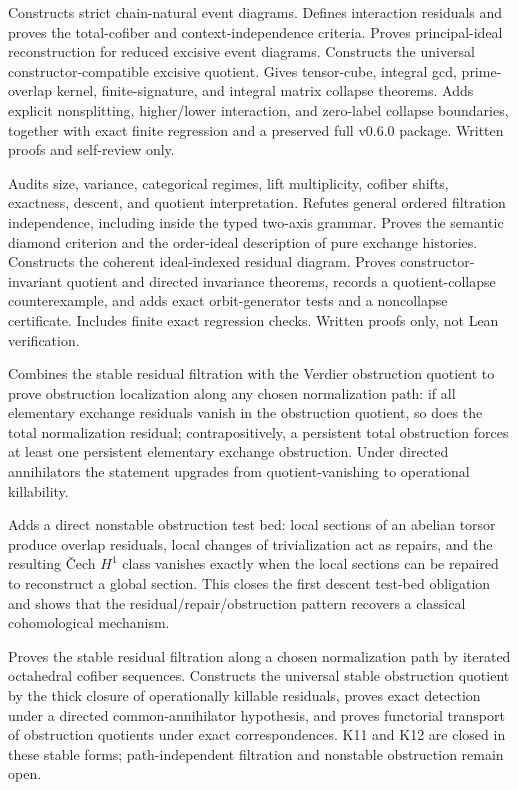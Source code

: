 \documentclass[11pt]{article}
\theoremstyle{definition}
\theoremstyle{remark}
\begin{document}
\begingroup\small\raggedright
\begin{description}[leftmargin=8em,style=nextline]
\item[v0.7.0] Constructs strict chain-natural event diagrams. Defines interaction residuals and proves the total-cofiber and context-independence criteria. Proves principal-ideal reconstruction for reduced excisive event diagrams. Constructs the universal constructor-compatible excisive quotient. Gives tensor-cube, integral gcd, prime-overlap kernel, finite-signature, and integral matrix collapse theorems. Adds explicit nonsplitting, higher/lower interaction, and zero-label collapse boundaries, together with exact finite regression and a preserved full v0.6.0 package. Written proofs and self-review only.
\item[v0.6.0] Audits size, variance, categorical regimes, lift multiplicity, cofiber shifts, exactness, descent, and quotient interpretation. Refutes general ordered filtration independence, including inside the typed two-axis grammar. Proves the semantic diamond criterion and the order-ideal description of pure exchange histories. Constructs the coherent ideal-indexed residual diagram. Proves constructor-invariant quotient and directed invariance theorems, records a quotient-collapse counterexample, and adds exact orbit-generator tests and a noncollapse certificate. Includes finite exact regression checks. Written proofs only, not Lean verification.
\item[v0.5.0] Combines the stable residual filtration with the Verdier obstruction quotient to prove obstruction localization along any chosen normalization path: if all elementary exchange residuals vanish in the obstruction quotient, so does the total normalization residual; contrapositively, a persistent total obstruction forces at least one persistent elementary exchange obstruction. Under directed annihilators the statement upgrades from quotient-vanishing to operational killability.
\item[v0.4.0] Adds a direct nonstable obstruction test bed: local sections of an abelian torsor produce overlap residuals, local changes of trivialization act as repairs, and the resulting \v{C}ech $H^1$ class vanishes exactly when the local sections can be repaired to reconstruct a global section. This closes the first descent test-bed obligation and shows that the residual/repair/obstruction pattern recovers a classical cohomological mechanism.
\item[v0.3.0] Proves the stable residual filtration along a chosen normalization path by iterated octahedral cofiber sequences. Constructs the universal stable obstruction quotient by the thick closure of operationally killable residuals, proves exact detection under a directed common-annihilator hypothesis, and proves functorial transport of obstruction quotients under exact correspondences. K11 and K12 are closed in these stable forms; path-independent filtration and nonstable obstruction remain open.

\end{description}
\end{document}
